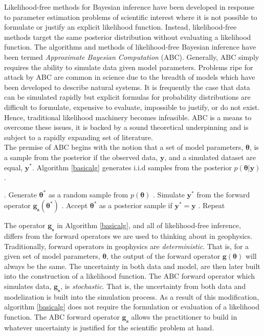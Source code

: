 Likelihood-free methods for Bayesian inference have been developed in response to parameter estimation problems of scientific interest where it is not possible to formulate or justify an explicit likelihood function. Instead, likelihood-free methods target the same posterior distribution without evaluating a likelihood function. The algorithms and methods of likelihood-free Bayesian inference have been termed \textit{Approximate Bayesian Computation} (ABC). Generally, ABC simply requires the ability to simulate data given model parameters. Problems ripe for attack by ABC are common in science due to the breadth of models which have been developed to describe natural systems. It is frequently the case that data can be simulated rapidly but explicit formulas for probability distributions are difficult to formulate, expensive to evaluate, impossible to justify, or do not exist. Hence, traditional likelihood machinery becomes infeasible. ABC is a means to overcome these issues, it is backed by a sound theoretical underpinning and is subject to a rapidly expanding set of literature. \\

The premise of ABC begins with the notion that a set of model parameters, $\bm{\theta}$, is a sample from the posterior if the observed data, $\bm{y}$, and a simulated dataset are equal, $\bm{y^*}$. Algorithm \ref{basicalg} generates i.i.d samples from the posterior $p(\bm{\theta}|\bm{y})$.

\begin{algorithm}[H]
	\caption{ }
	\begin{algorithmic}
		. Generate $\bm{\theta^*}$ as a random sample from $p(\bm{\theta})$		
		. Simulate $\bm{y^*}$ from the forward operator $\bm{g_s}(\bm{\theta^*})$		
		. Accept $\bm{\theta^*}$ as a posterior sample if $\bm{y^*} = \bm{y}$		
		. Repeat
	\end{algorithmic}
	\label{basicalg}
\end{algorithm}

The operator $\bm{g_s}$ in Algorithm \ref{basicalg}, and all of likelihood-free inference, differs from the forward operators we are used to thinking about in geophysics. Traditionally, forward operators in geophysics are \textit{deterministic}. That is, for a given set of model parameters, $\bm{\theta}$, the output of the forward operator $\bm{g}(\bm{\theta})$ will always be the same. The uncertainty in both data and model, are then later built into the construction of a likelihood function. The ABC forward operator which simulates data, $\bm{g_s}$, is \textit{stochastic}. That is, the uncertainty from both data and modelization is built into the simulation process. As a result of this modification, algorithm \ref{basicalg} does not require the formulation or evaluation of a likelihood function. The ABC forward operator $\bm{g_s}$ allows the practitioner to build in whatever uncertainty is justified for the scientific problem at hand.\\

